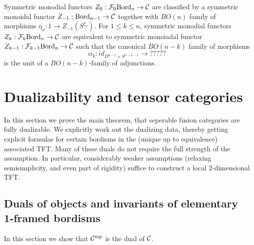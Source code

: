 \documentclass{amsart}
\begin{document}
\begin{theorem}
	Symmetric monodial functors $Z_0: \mathcal F_{0}\mathrm{Bord}_n \to \mathcal C$ are classified by a symmetric monoidal functor $Z_{-1}:\mathrm{Bord}_{n-1} \to \mathcal C$ together with $BO(n)$ family of morphisms $\eta_x: 1 \to Z_{-1}(S^{\xi_x})$. For $1 \leq k \leq n$, symmetric monodial functors $Z_k: \mathcal F_{k}\mathrm{Bord}_n \to \mathcal C$ are equivalent to symmetric monoiadal functor $Z_{k-1}: \mathcal F_{k-1}\mathrm{Bord}_n \to \mathcal C $ such that the canonical $BO(n-k)$ family of morphisms 
	\begin{equation*}
		\alpha_k: id_{D^{k-1} \times S^{n-k -1}} \to ?????
	\end{equation*}
	is the unit of a $BO(n-k)$-family of adjunctions. 
\end{theorem}


\section{Dualizability and tensor categories} \label{sec-dualfusion}

In this section we prove the main theorem, that seperable fusion categories are fully dualizable.  We explicitly work out the dualizing data, thereby getting explicit formulas for certain bordisms in the (unique up to equivalence) associated TFT.  Many of these duals do not require the full strength of the assumption.  In particular, considerably weaker assumptions (relaxing semisimplicity, and even part of rigidity) suffice to construct a local $2$-dimensional TFT.

\subsection{Duals of objects and invariants of elementary 1-framed bordisms} \label{sec-df-objects}

In this section we show that $\mathcal C^{\mathrm{mp}}$ is the dual of $\mathcal C$. 
\end{document}
